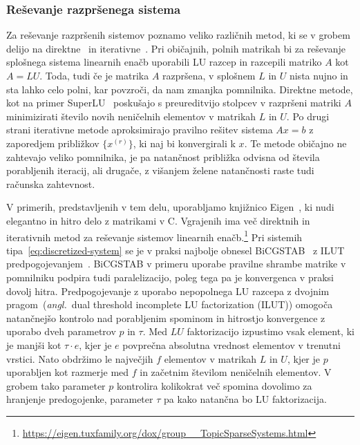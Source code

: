 \documentclass[12pt,a4paper,twoside]{article}
\theoremstyle{definition} %
\theoremstyle{plain} %
\numberwithin{equation}{section}
\newcommand{\ang}[1]{(\textit{angl.}\ #1)}
\newcommand{\CC}{C\nolinebreak\hspace{-.05em}\raisebox{.4ex}{\tiny\bf +}\nolinebreak\hspace{-.10em}\raisebox{.4ex}{\tiny\bf +}}
\begin{document}
\subsubsection{Reševanje razpršenega sistema}
\label{sec:solve-sparse}
Za reševanje razpršenih sistemov poznamo veliko različnih metod, ki se v grobem delijo na
direktne~\cite{davis2006direct} in iterativne~\cite{saad2003iterative}.  Pri običajnih, polnih
matrikah bi za reševanje splošnega sistema linearnih enačb uporabili LU razcep in razcepili matriko
$A$ kot $A = LU$. Toda, tudi če je matrika $A$ razpršena, v splošnem $L$ in $U$ nista nujno in sta
lahko celo polni, kar povzroči, da nam zmanjka pomnilnika. Direktne metode, kot na primer
SuperLU~\cite{li2005overview} poskušajo s preureditvijo stolpcev v razpršeni matriki $A$
minimizirati število novih neničelnih elementov v matrikah $L$ in $U$. Po drugi strani iterativne
metode aproksimirajo pravilno rešitev sistema $Ax=b$ z zaporedjem približkov $\{x^{(r)}\}$, ki naj
bi konvergirali k $x$. Te metode običajno ne zahtevajo veliko pomnilnika, je pa natančnost približka
odvisna od števila porabljenih iteracij, ali drugače, z višanjem želene natančnosti raste tudi
računska zahtevnost.

V primerih, predstavljenih v tem delu, uporabljamo knjižnico Eigen~\cite{eigenweb}, ki nudi
elegantno in hitro delo z matrikami v \CC.  Vgrajenih ima več direktnih in iterativnih metod za
reševanje sistemov linearnih
enačb.\footnote{\url{https://eigen.tuxfamily.org/dox/group__TopicSparseSystems.html}
  \newline
[obiskano 17.\ 6.\ 2017]}
Pri sistemih tipa~\eqref{eq:discretized-system} se je v praksi najbolje obnesel
BiCGSTAB~\cite{van1992bi} z ILUT predpogojevanjem~\cite{saad1994ilut}. BiCGSTAB v primeru uporabe
pravilne shrambe matrike v pomnilniku podpira tudi paralelizacijo, poleg tega pa je konvergenca v
praksi dovolj hitra. Predpogojevanje z uporabo nepopolnega LU razcepa z dvojnim pragom~\ang{dual
threshold incomplete LU factorization (ILUT)} omogoča natančnejšo kontrolo nad porabljenim spominom
in hitrostjo konvergence z uporabo dveh parametrov $p$ in $\tau$. Med $LU$ faktorizacijo izpustimo
vsak element, ki je manjši kot $\tau\cdot e$, kjer je $e$ povprečna absolutna vrednost elementov v
trenutni vrstici. Nato obdržimo le največjih $f$ elementov v matrikah $L$ in $U$, kjer je $p$
uporabljen kot razmerje med $f$ in začetnim številom neničelnih elementov. V grobem tako parameter
$p$ kontrolira kolikokrat več spomina dovolimo za hranjenje predogojenke, parameter $\tau$ pa kako
natančna bo LU faktorizacija.
\end{document}
